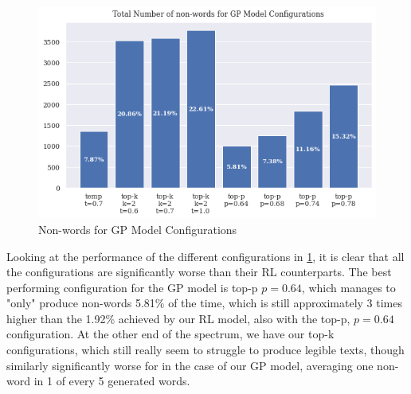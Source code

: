 \begin{figure}[ht!]
    \centering
    \includegraphics[scale=0.68, keepaspectratio=true]{figures/gp_non-words.png}
    \caption{Non-words for GP Model Configurations}
    \label{fig:gp_non-words}
\end{figure}

Looking at the performance of the different configurations in \cref{fig:gp_non-words}, it is clear that all the configurations are significantly worse than their RL counterparts. The best performing configuration for the GP model is top-p $p=0.64$, which manages to "only" produce non-words 5.81\% of the time, which is still approximately 3 times higher than the 1.92\% achieved by our RL model, also with the top-p, $p=0.64$ configuration. At the other end of the spectrum, we have our top-k configurations, which still really seem to struggle to produce legible texts, though similarly significantly worse for in the case of our GP model, averaging one non-word in 1 of every 5 generated words.

